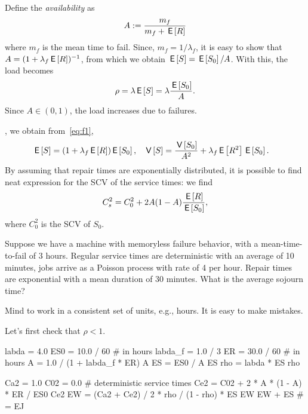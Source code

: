 Define the \emph{availability} as
\begin{equation}\label{eq:91}
 A:=\frac{m_f}{m_f + \,\mathsf{E}\left[R\right]}
\end{equation}
where $m_f$ is the mean time to fail. Since, $m_f = 1/\lambda_f$, it is easy to show that $A=(1+\lambda_f \,\mathsf{E}\left[R\right])^{-1}$, from which we obtain
 $\,\mathsf{E}\left[S\right] = \,\mathsf{E}\left[S_0\right]/A$.
With this, the load becomes
\begin{equation*}
\rho = \lambda \,\mathsf{E}\left[S\right] = \lambda \frac{\,\mathsf{E}\left[S_0\right]}A.
\end{equation*}
Since $A\in (0,1)$, the load increases due to failures.

, we obtain from~\cref{eq:f1},
 \begin{align}\label{eq:f2}
\,\mathsf{E}\left[S\right] &= (1+\lambda_f \,\mathsf{E}\left[R\right]) \,\mathsf{E}\left[S_0\right], & \,\mathsf{V}\left[S\right] &= \frac{\,\mathsf{V}\left[S_0\right]}{A^2} + \lambda_f \,\mathsf{E}\left[R^2\right] \,\mathsf{E}\left[S_0\right].
 \end{align}
By assuming that repair times are exponentially distributed, it is possible to find neat expression for the SCV of the service times:
we  find
\begin{equation}\label{eq:f3}
 C_s^2 = C_0^2 + 2 A(1-A) \frac{\,\mathsf{E}\left[R\right]}{\,\mathsf{E}\left[S_0\right]},
\end{equation}
where $C_0^2$ is the SCV of $S_0$.





\begin{exercise}\label{ex:l-157}
 Suppose we have a machine with memoryless failure behavior, with a mean-time-to-fail of $3$ hours. Regular service times are deterministic with an average of 10 minutes, jobs arrive as a Poisson process with rate of 4 per hour. Repair times are exponential with a mean duration of 30 minutes. What is the average sojourn time?
\begin{hint}
 Mind to work in a consistent set of units, e.g., hours. It is easy to make mistakes.
\end{hint}
\begin{solution}
  Let's first check that $\rho< 1$.
\begin{pyconsole}
labda = 4.0
ES0 = 10.0 / 60  # in hours
labda_f = 1.0 / 3
ER = 30.0 / 60  # in hours
A = 1.0 / (1 + labda_f * ER)
A
ES = ES0 / A
ES
rho = labda * ES
rho
\end{pyconsole}
\begin{pyconsole}
Ca2 = 1.0
C02 = 0.0  # deterministic service times
Ce2 = C02 + 2 * A * (1 - A) * ER / ES0
Ce2
EW = (Ca2 + Ce2) / 2 * rho / (1 - rho) * ES
EW
EW + ES  # = EJ
\end{pyconsole}
\end{solution}
\end{exercise}

